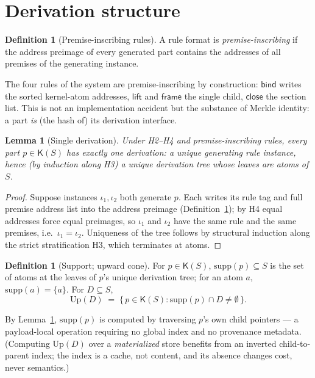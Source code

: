 \documentclass[11pt]{article}
\newtheorem{lemma}[theorem]{Lemma}
\theoremstyle{definition}
\newtheorem{definition}[theorem]{Definition}
\theoremstyle{remark}
\newcommand{\K}{\mathsf{K}}
\newcommand{\Up}{\mathrm{Up}}
\newcommand{\supp}{\mathrm{supp}}
\newcommand{\sub}{\subseteq}
\begin{document}
\section{Derivation structure}\label{sec:derivation}

\begin{definition}[Premise-inscribing rules]\label{def:inscribe}
A rule format is \emph{premise-inscribing} if the address preimage of every generated part contains the addresses of all premises of the generating instance.
\end{definition}

The four rules of the system are premise-inscribing by construction: $\mathsf{bind}$ writes the sorted kernel-atom addresses, $\mathsf{lift}$ and $\mathsf{frame}$ the single child, $\mathsf{close}$ the section list. This is not an implementation accident but the substance of Merkle identity: a part \emph{is} (the hash of) its derivation interface.

\begin{lemma}[Single derivation]\label{lem:single}
Under H2--H4 and premise-inscribing rules, every part $p \in \K(S)$ has exactly one derivation: a unique generating rule instance, hence (by induction along H3) a unique derivation tree whose leaves are atoms of $S$.
\end{lemma}

\begin{proof}
Suppose instances $\iota_1, \iota_2$ both generate $p$. Each writes its rule tag and full premise address list into the address preimage (Definition~\ref{def:inscribe}); by H4 equal addresses force equal preimages, so $\iota_1$ and $\iota_2$ have the same rule and the same premises, i.e.\ $\iota_1 = \iota_2$. Uniqueness of the tree follows by structural induction along the strict stratification H3, which terminates at atoms.
\end{proof}

\begin{definition}[Support; upward cone]\label{def:supp}
For $p \in \K(S)$, $\supp(p) \sub S$ is the set of atoms at the leaves of $p$'s unique derivation tree; for an atom $a$, $\supp(a) = \{a\}$. For $D \sub S$,
\[ \Up(D) \;=\; \{\, p \in \K(S) : \supp(p) \cap D \neq \emptyset \,\}. \]
\end{definition}

By Lemma~\ref{lem:single}, $\supp(p)$ is computed by traversing $p$'s own child pointers --- a payload-local operation requiring no global index and no provenance metadata. (Computing $\Up(D)$ over a \emph{materialized} store benefits from an inverted child-to-parent index; the index is a cache, not content, and its absence changes cost, never semantics.)
\end{document}
